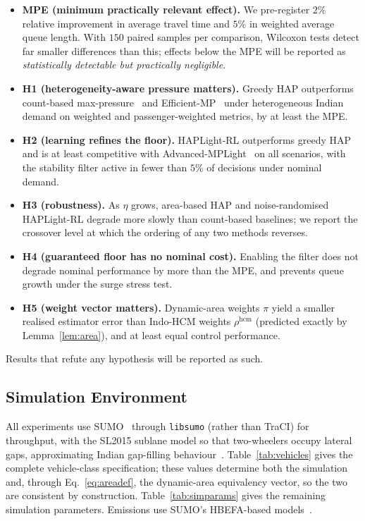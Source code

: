 \documentclass[journal]{IEEEtran}
\begin{document}
\begin{itemize}
\item \textbf{MPE (minimum practically relevant effect).} We pre-register
      $2\%$ relative improvement in average travel time and $5\%$ in
      weighted average queue length. With $150$ paired samples per
      comparison, Wilcoxon tests detect far smaller differences than
      this; effects below the MPE will be reported as
      \emph{statistically detectable but practically negligible}.
\item \textbf{H1 (heterogeneity-aware pressure matters).} Greedy HAP
      outperforms count-based max-pressure~\cite{b_varaiya} and
      Efficient-MP~\cite{b_efficientmp} under heterogeneous Indian demand
      on weighted and passenger-weighted metrics, by at least the MPE.
\item \textbf{H2 (learning refines the floor).} HAPLight-RL outperforms
      greedy HAP and is at least competitive with
      Advanced-MPLight~\cite{b_advxlight} on all scenarios, with the
      stability filter active in fewer than $5\%$ of decisions under
      nominal demand.
\item \textbf{H3 (robustness).} As $\eta$ grows, area-based HAP and
      noise-randomised HAPLight-RL degrade more slowly than count-based
      baselines; we report the crossover level at which the ordering of
      any two methods reverses.
\item \textbf{H4 (guaranteed floor has no nominal cost).} Enabling the
      filter does not degrade nominal performance by more than the MPE,
      and prevents queue growth under the surge stress test.
\item \textbf{H5 (weight vector matters).} Dynamic-area weights $\pi$
      yield a smaller realised estimator error than Indo-HCM weights
      $\rho^{\mathrm{hcm}}$ (predicted exactly by
      Lemma~\ref{lem:area}), and at least equal control performance.
\end{itemize}
Results that refute any hypothesis will be reported as such.

\subsection{Simulation Environment}
All experiments use SUMO~\cite{b_sumo} through \texttt{libsumo} (rather
than TraCI) for throughput, with the SL2015 sublane model so that
two-wheelers occupy lateral gaps, approximating Indian gap-filling
behaviour~\cite{b_simtram}. Table~\ref{tab:vehicles} gives the complete
vehicle-class specification; these values determine both the simulation
and, through Eq.~\eqref{eq:areadef}, the dynamic-area equivalency vector,
so the two are consistent by construction. Table~\ref{tab:simparams}
gives the remaining simulation parameters. Emissions use SUMO's
HBEFA-based models~\cite{b_hbefa}.
\end{document}

